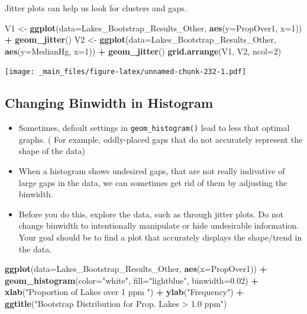 \documentclass[]{book}
\newenvironment{Shaded}{\begin{snugshade}}{\end{snugshade}}
\newcommand{\KeywordTok}[1]{\textcolor[rgb]{0.13,0.29,0.53}{\textbf{#1}}}
\newcommand{\DataTypeTok}[1]{\textcolor[rgb]{0.13,0.29,0.53}{#1}}
\newcommand{\DecValTok}[1]{\textcolor[rgb]{0.00,0.00,0.81}{#1}}
\newcommand{\FloatTok}[1]{\textcolor[rgb]{0.00,0.00,0.81}{#1}}
\newcommand{\StringTok}[1]{\textcolor[rgb]{0.31,0.60,0.02}{#1}}
\newcommand{\OperatorTok}[1]{\textcolor[rgb]{0.81,0.36,0.00}{\textbf{#1}}}
\newcommand{\NormalTok}[1]{#1}
\begin{document}
Jitter plots can help us look for clusters and gaps.

\begin{Shaded}
\begin{Highlighting}[]
\NormalTok{V1 <-}\StringTok{ }\KeywordTok{ggplot}\NormalTok{(}\DataTypeTok{data=}\NormalTok{Lakes_Bootstrap_Results_Other, }\KeywordTok{aes}\NormalTok{(}\DataTypeTok{y=}\NormalTok{PropOver1, }\DataTypeTok{x=}\DecValTok{1}\NormalTok{)) }\OperatorTok{+}\StringTok{ }\KeywordTok{geom_jitter}\NormalTok{()}
\NormalTok{V2 <-}\StringTok{ }\KeywordTok{ggplot}\NormalTok{(}\DataTypeTok{data=}\NormalTok{Lakes_Bootstrap_Results_Other, }\KeywordTok{aes}\NormalTok{(}\DataTypeTok{y=}\NormalTok{MedianHg, }\DataTypeTok{x=}\DecValTok{1}\NormalTok{)) }\OperatorTok{+}\StringTok{ }\KeywordTok{geom_jitter}\NormalTok{()}
\KeywordTok{grid.arrange}\NormalTok{(V1, V2, }\DataTypeTok{ncol=}\DecValTok{2}\NormalTok{)}
\end{Highlighting}
\end{Shaded}

\texttt{[image: \_main\_files/figure-latex/unnamed-chunk-232-1.pdf]}

\subsection{Changing Binwidth in
Histogram}\label{changing-binwidth-in-histogram}

\begin{itemize}
\item
  Sometimes, default settings in \texttt{geom\_histogram()} lead to less
  that optimal graphs. ( For example, oddly-placed gaps that do not
  accurately represent the shape of the data)
\item
  When a histogram shows undesired gaps, that are not really indivative
  of large gaps in the data, we can sometimes get rid of them by
  adjusting the binwidth.
\item
  Before you do this, explore the data, such as through jitter plots. Do
  not change binwidth to intentionally manipulate or hide undesirable
  information. Your goal should be to find a plot that accurately
  displays the shape/trend in the data.
\end{itemize}

\begin{Shaded}
\begin{Highlighting}[]
\KeywordTok{ggplot}\NormalTok{(}\DataTypeTok{data=}\NormalTok{Lakes_Bootstrap_Results_Other, }\KeywordTok{aes}\NormalTok{(}\DataTypeTok{x=}\NormalTok{PropOver1)) }\OperatorTok{+}\StringTok{  }
\StringTok{  }\KeywordTok{geom_histogram}\NormalTok{(}\DataTypeTok{color=}\StringTok{"white"}\NormalTok{, }\DataTypeTok{fill=}\StringTok{"lightblue"}\NormalTok{, }\DataTypeTok{binwidth=}\FloatTok{0.02}\NormalTok{) }\OperatorTok{+}\StringTok{ }
\StringTok{  }\KeywordTok{xlab}\NormalTok{(}\StringTok{"Proportion of Lakes over 1 ppm "}\NormalTok{) }\OperatorTok{+}\StringTok{ }\KeywordTok{ylab}\NormalTok{(}\StringTok{"Frequency"}\NormalTok{) }\OperatorTok{+}
\StringTok{  }\KeywordTok{ggtitle}\NormalTok{(}\StringTok{"Bootstrap Distribution for Prop. Lakes > 1.0 ppm"}\NormalTok{) }
\end{Highlighting}
\end{Shaded}
\end{document}
